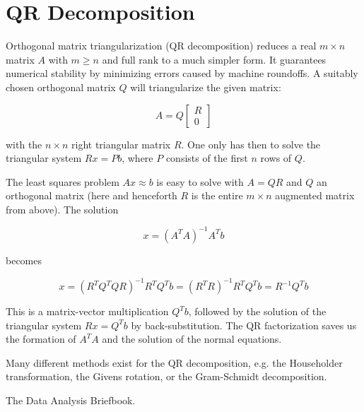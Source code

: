 \documentclass[12pt]{article}
\begin{document}
\section{QR Decomposition}

Orthogonal matrix triangularization (QR decomposition) reduces a real $m \times n$ matrix $A$ with $m \ge n$  and full rank to a much simpler form. It guarantees numerical stability by minimizing errors caused by machine roundoffs. A suitably chosen orthogonal matrix $Q$ will triangularize the given matrix:

$$ A = Q \begin{bmatrix} R \\ 0 \end{bmatrix} $$

with the $n \times n$ right triangular matrix $R$. One only has then to solve the triangular system $Rx = Pb$, where $P$ consists of the first $n$ rows of $Q$.

The least squares problem $Ax \approx b$ is easy to solve with $A = QR$ and $Q$ an orthogonal matrix (here and henceforth $R$ is the entire $ m \times n $ augmented matrix from above). The solution

$$ x = (A^TA)^{-1} A^Tb $$

becomes

$$ x = (R^TQ^TQR)^{-1}R^TQ^Tb = (R^TR)^{-1}R^TQ^Tb = R^{-1}Q^Tb $$

This is a matrix-vector multiplication $Q^Tb$, followed by the solution of the triangular system $Rx = Q^Tb$ by back-substitution. The QR factorization saves us the formation of $A^TA$ and the solution of the normal equations.

Many different methods exist for the QR decomposition, e.g. the Householder transformation, the Givens rotation, or the Gram-Schmidt decomposition.

\begin{thebibliography}{3}

 The Data Analysis Briefbook. 

\end{thebibliography}
\end{document}
